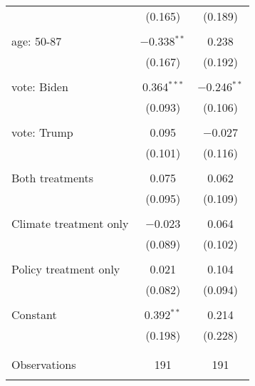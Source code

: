 \begin{tabular}{@{\extracolsep{5pt}}lcc}
  & (0.165) & (0.189) \\ 
  & & \\ 
 age: 50-87 & $-$0.338$^{**}$ & 0.238 \\ 
  & (0.167) & (0.192) \\ 
  & & \\ 
 vote: Biden & 0.364$^{***}$ & $-$0.246$^{**}$ \\ 
  & (0.093) & (0.106) \\ 
  & & \\ 
 vote: Trump & 0.095 & $-$0.027 \\ 
  & (0.101) & (0.116) \\ 
  & & \\ 
 Both treatments & 0.075 & 0.062 \\ 
  & (0.095) & (0.109) \\ 
  & & \\ 
 Climate treatment only & $-$0.023 & 0.064 \\ 
  & (0.089) & (0.102) \\ 
  & & \\ 
 Policy treatment only & 0.021 & 0.104 \\ 
  & (0.082) & (0.094) \\ 
  & & \\ 
 Constant & 0.392$^{**}$ & 0.214 \\ 
  & (0.198) & (0.228) \\ 
  & & \\ 
\hline \\[-1.8ex] 

Observations & 191 & 191 \\ 
\hline 
\hline \\[-1.8ex] 
\end{tabular} 
